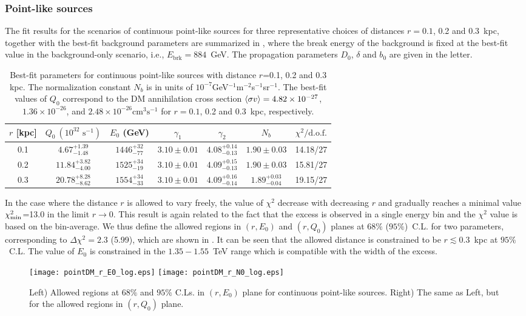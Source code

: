 \subsubsection{Point-like sources}
The fit results for the scenarios of continuous point-like sources for 
three representative choices of distances $r=0.1$, 0.2 and 0.3~kpc,
together with the best-fit background parameters  are 
summarized in ,
where the break energy of the background is fixed at 
the best-fit value in the background-only scenario, i.e., $E_{\text{brk}}=884$~GeV.
The propagation parameters $D_{0}$, $\delta$ and $b_{0}$ are given in the letter.
\begin{table}[htbp]
	\centering
		\begin{tabular}{c|ccccc|c}
		\hline\hline
		  $r$ [kpc] & $Q_0\ (10^{32} \text{ s}^{-1})$ & $E_0$ (GeV)& $\gamma_1$ & $\gamma_2$ & $N_b$  & $\chi^2/\text{d.o.f.}$ \\
\hline
0.1 & $4.67^{+1.39}_{-1.48}$& $1446^{+32}_{-77}$& $3.10\pm0.01$ & $4.08^{+0.14}_{-0.13}$& $1.90\pm0.03$  & 14.18/27 \\
0.2 & $11.84^{+3.82}_{-4.00}$ & $1525^{+34}_{-19}$ & $3.10\pm0.01$ & $4.09^{+0.15}_{-0.13}$ & $1.90\pm0.03$ & 15.81/27 \\
0.3 &  $20.78^{+8.28}_{-8.62}$ & $1554^{+34}_{-33}$ & $3.10\pm0.01$ & $4.09^{+0.16}_{-0.14}$ & $1.89^{+0.03}_{-0.04}$ & 19.15/27 \\
\hline\hline
\end{tabular}
	\caption{
	Best-fit parameters  for continuous point-like sources with distance $r$=0.1, 0.2 and 0.3 kpc.
	The normalization constant $N_b$ is in units of  
	$10^{-7}$GeV$^{-1}$m$^{-2}$s$^{-1}$sr$^{-1}$.
	The best-fit values of $Q_{0}$ correspond to the DM annihilation cross section 
	$\langle \sigma v \rangle=4.82\times10^{-27}$, $1.36\times10^{-26}$, 
	and $2.48\times10^{-26} \text{cm}^3\text{s}^{-1}$ for
	$r=0.1$, 0.2 and 0.3~kpc, respectively.
	}
\label{tab:pointDM}
\end{table}
In the case where the distance $r$ is allowed to vary freely, 
the value of $\chi^{2}$ decrease with decreasing $r$ and gradually reaches 
a minimal value  $\chi^{2}_{\text{min}}$=13.0 in the limit  $r\to 0$. 
This result is again related to the fact that the excess is observed in a single
energy bin and the $\chi^{2}$ value is based on the bin-average.
We thus define the  allowed regions in $(r, E_{0})$ and $(r,Q_{0})$ planes  
at $68\%$ ($95\%$)~C.L. for two parameters,
corresponding  to $\Delta \chi^{2}=2.3$ (5.99),
which are shown  in .
It can be seen that the allowed distance is constrained to be
$r \lesssim 0.3$~kpc at $95\%$~C.L.
The value of $E_{0}$ is constrained in the $1.35-1.55$~TeV range which is compatible with the 
width of the excess.
\begin{figure}[htb]
	\centering
	\texttt{[image: pointDM\_r\_E0\_log.eps]}
	\texttt{[image: pointDM\_r\_N0\_log.eps]}
	\caption{		
	Left) 
	Allowed regions at $68\%$ and $95\%$ C.Ls. in $(r, E_{0})$ plane for 
	continuous point-like sources.
	Right)
	The same as Left, but for the allowed regions in $(r, Q_{0})$ plane.	
	}\label{fig:pointDM-contour}
\end{figure}



